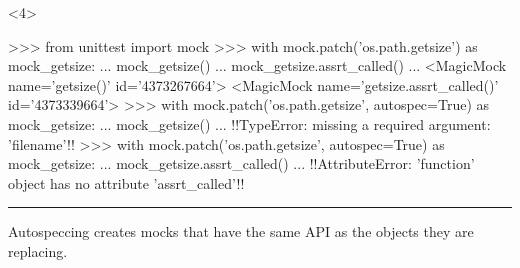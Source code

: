 \documentclass[xcolor={svgnames}]{beamer}
\newcommand{\hr}[2]{\vspace{#1}\hrule height 0.01mm\vspace{#2}}
\begin{document}
\begin{frame}[t,fragile]
    \begin{onlyenv}<4>
        \begin{pyenv}[style=footnotesize,gobble=12]
            >>> from unittest import mock
            >>> with mock.patch('os.path.getsize') as mock_getsize:
            ...     mock_getsize()
            ...     mock_getsize.assrt_called()
            ...
            <MagicMock name='getsize()' id='4373267664'>
            <MagicMock name='getsize.assrt_called()' id='4373339664'>
            >>> with mock.patch('os.path.getsize', autospec=True) as mock_getsize:
            ...     mock_getsize()
            ...
            !!TypeError: missing a required argument: 'filename'!!
            >>> with mock.patch('os.path.getsize', autospec=True) as mock_getsize:
            ...     mock_getsize.assrt_called()
            ...
            !!AttributeError: 'function' object has no attribute 'assrt_called'!!
        \end{pyenv}

        \hr{1mm}{1mm}

        \footnotesize
        Autospeccing creates mocks that have the same API as the objects
        they are replacing.
    \end{onlyenv}
\end{frame}
\end{document}
